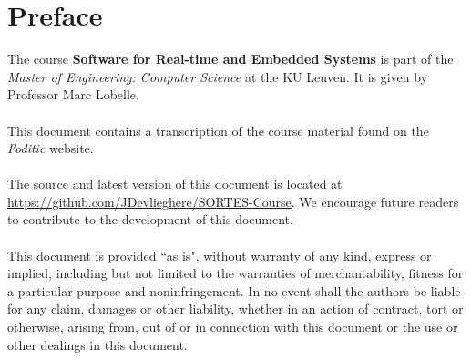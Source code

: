 \documentclass[main.tex]{subfiles}
\begin{document}
\chapter*{Preface}
The course \textbf{Software for Real-time and Embedded Systems} is part of the \textit{Master of Engineering: Computer Science} at the KU Leuven. It is given by Professor Marc Lobelle.
\\\\
This document contains a transcription of the course material found on the \textit{Foditic} website.
\\\\
The source and latest version of this document is located at \url{https://github.com/JDevlieghere/SORTES-Course}. We encourage future readers to contribute to the development of this document.
\\\\
This document is provided ``as is", without warranty of any kind, express or implied, including but not limited to the warranties of merchantability, fitness for a particular purpose and noninfringement.
In no event shall the authors be liable for any claim, damages or other liability, whether in an action of contract, tort or otherwise, arising from, out of or in connection with this document or the use or other dealings in this document.
\end{document}

